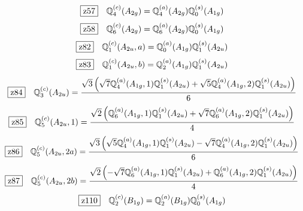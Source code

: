 \documentclass[fleqn,10pt,landscape]{jsarticle}
\begin{document}
\begin{dmath*}
\hspace*{3mm}\fbox{z57}\quad \mathbb{Q}_{4}^{(c)}(A_{2g})=\mathbb{Q}_{4}^{(a)}(A_{2g}) \mathbb{Q}_{0}^{(s)}(A_{1g})
\end{dmath*}
\begin{dmath*}
\hspace*{3mm}\fbox{z58}\quad \mathbb{Q}_{6}^{(c)}(A_{2g})=\mathbb{Q}_{6}^{(a)}(A_{2g}) \mathbb{Q}_{0}^{(s)}(A_{1g})
\end{dmath*}
\begin{dmath*}
\hspace*{3mm}\fbox{z82}\quad \mathbb{Q}_{1}^{(c)}(A_{2u},a)=\mathbb{Q}_{0}^{(a)}(A_{1g}) \mathbb{Q}_{1}^{(s)}(A_{2u})
\end{dmath*}
\begin{dmath*}
\hspace*{3mm}\fbox{z83}\quad \mathbb{Q}_{1}^{(c)}(A_{2u},b)=\mathbb{Q}_{2}^{(a)}(A_{1g}) \mathbb{Q}_{1}^{(s)}(A_{2u})
\end{dmath*}
\begin{dmath*}
\hspace*{3mm}\fbox{z84}\quad \mathbb{Q}_{3}^{(c)}(A_{2u})=\frac{\sqrt{3} \left(\sqrt{7} \mathbb{Q}_{4}^{(a)}(A_{1g},1) \mathbb{Q}_{1}^{(s)}(A_{2u}) + \sqrt{5} \mathbb{Q}_{4}^{(a)}(A_{1g},2) \mathbb{Q}_{1}^{(s)}(A_{2u})\right)}{6}
\end{dmath*}
\begin{dmath*}
\hspace*{3mm}\fbox{z85}\quad \mathbb{Q}_{5}^{(c)}(A_{2u},1)=\frac{\sqrt{2} \left(\mathbb{Q}_{6}^{(a)}(A_{1g},1) \mathbb{Q}_{1}^{(s)}(A_{2u}) + \sqrt{7} \mathbb{Q}_{6}^{(a)}(A_{1g},2) \mathbb{Q}_{1}^{(s)}(A_{2u})\right)}{4}
\end{dmath*}
\begin{dmath*}
\hspace*{3mm}\fbox{z86}\quad \mathbb{Q}_{5}^{(c)}(A_{2u},2a)=\frac{\sqrt{3} \left(\sqrt{5} \mathbb{Q}_{4}^{(a)}(A_{1g},1) \mathbb{Q}_{1}^{(s)}(A_{2u}) - \sqrt{7} \mathbb{Q}_{4}^{(a)}(A_{1g},2) \mathbb{Q}_{1}^{(s)}(A_{2u})\right)}{6}
\end{dmath*}
\begin{dmath*}
\hspace*{3mm}\fbox{z87}\quad \mathbb{Q}_{5}^{(c)}(A_{2u},2b)=\frac{\sqrt{2} \left(- \sqrt{7} \mathbb{Q}_{6}^{(a)}(A_{1g},1) \mathbb{Q}_{1}^{(s)}(A_{2u}) + \mathbb{Q}_{6}^{(a)}(A_{1g},2) \mathbb{Q}_{1}^{(s)}(A_{2u})\right)}{4}
\end{dmath*}
\begin{dmath*}
\hspace*{3mm}\fbox{z110}\quad \mathbb{Q}_{2}^{(c)}(B_{1g})=\mathbb{Q}_{2}^{(a)}(B_{1g}) \mathbb{Q}_{0}^{(s)}(A_{1g})
\end{dmath*}
\end{document}
